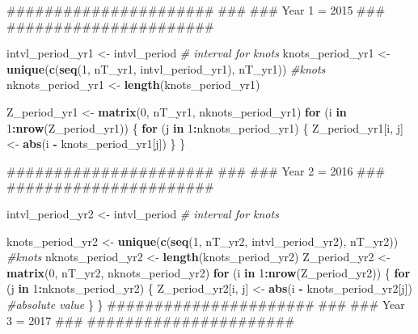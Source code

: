 \documentclass[11pt,]{article}
\newenvironment{Shaded}{\begin{snugshade}}{\end{snugshade}}
\newcommand{\KeywordTok}[1]{\textcolor[rgb]{0.13,0.29,0.53}{\textbf{#1}}}
\newcommand{\DecValTok}[1]{\textcolor[rgb]{0.00,0.00,0.81}{#1}}
\newcommand{\StringTok}[1]{\textcolor[rgb]{0.31,0.60,0.02}{#1}}
\newcommand{\CommentTok}[1]{\textcolor[rgb]{0.56,0.35,0.01}{\textit{#1}}}
\newcommand{\ControlFlowTok}[1]{\textcolor[rgb]{0.13,0.29,0.53}{\textbf{#1}}}
\newcommand{\OperatorTok}[1]{\textcolor[rgb]{0.81,0.36,0.00}{\textbf{#1}}}
\newcommand{\NormalTok}[1]{#1}
\begin{document}
\begin{Shaded}
\begin{Highlighting}[]
\NormalTok{######################}
\NormalTok{###}
\NormalTok{### Year 1 = 2015}
\NormalTok{###}
\NormalTok{######################}

\NormalTok{intvl_period_yr1 <-}\StringTok{ }\NormalTok{intvl_period }\CommentTok{# interval for knots}
\NormalTok{knots_period_yr1 <-}\StringTok{ }\KeywordTok{unique}\NormalTok{(}\KeywordTok{c}\NormalTok{(}\KeywordTok{seq}\NormalTok{(}\DecValTok{1}\NormalTok{,}
\NormalTok{                                 nT_yr1,}
\NormalTok{                                 intvl_period_yr1),}
\NormalTok{                             nT_yr1)) }\CommentTok{#knots}
\NormalTok{nknots_period_yr1 <-}\StringTok{ }\KeywordTok{length}\NormalTok{(knots_period_yr1)}

\NormalTok{Z_period_yr1 <-}\StringTok{ }\KeywordTok{matrix}\NormalTok{(}\DecValTok{0}\NormalTok{,}
\NormalTok{                     nT_yr1,}
\NormalTok{                     nknots_period_yr1)}
\ControlFlowTok{for}\NormalTok{ (i }\ControlFlowTok{in} \DecValTok{1}\OperatorTok{:}\KeywordTok{nrow}\NormalTok{(Z_period_yr1)) \{}
  \ControlFlowTok{for}\NormalTok{ (j }\ControlFlowTok{in} \DecValTok{1}\OperatorTok{:}\NormalTok{nknots_period_yr1) \{}
\NormalTok{    Z_period_yr1[i, j] <-}\StringTok{ }\KeywordTok{abs}\NormalTok{(i }\OperatorTok{-}\StringTok{ }\NormalTok{knots_period_yr1[j])}
\NormalTok{  \}}
\NormalTok{\}}

\NormalTok{######################}
\NormalTok{###}
\NormalTok{### Year 2 = 2016}
\NormalTok{###}
\NormalTok{######################}

\NormalTok{intvl_period_yr2 <-}\StringTok{ }\NormalTok{intvl_period }\CommentTok{# interval for knots}

\NormalTok{knots_period_yr2 <-}\StringTok{ }\KeywordTok{unique}\NormalTok{(}\KeywordTok{c}\NormalTok{(}\KeywordTok{seq}\NormalTok{(}\DecValTok{1}\NormalTok{,}
\NormalTok{                               nT_yr2,}
\NormalTok{                               intvl_period_yr2),}
\NormalTok{                            nT_yr2)) }\CommentTok{#knots}
\NormalTok{nknots_period_yr2 <-}\StringTok{ }\KeywordTok{length}\NormalTok{(knots_period_yr2)}
\NormalTok{Z_period_yr2 <-}\StringTok{ }\KeywordTok{matrix}\NormalTok{(}\DecValTok{0}\NormalTok{,}
\NormalTok{                       nT_yr2,}
\NormalTok{                       nknots_period_yr2)}
\ControlFlowTok{for}\NormalTok{ (i }\ControlFlowTok{in} \DecValTok{1}\OperatorTok{:}\KeywordTok{nrow}\NormalTok{(Z_period_yr2)) \{}
  \ControlFlowTok{for}\NormalTok{ (j }\ControlFlowTok{in} \DecValTok{1}\OperatorTok{:}\NormalTok{nknots_period_yr2) \{}
\NormalTok{    Z_period_yr2[i, j] <-}\StringTok{ }\KeywordTok{abs}\NormalTok{(i }\OperatorTok{-}\StringTok{ }\NormalTok{knots_period_yr2[j]) }\CommentTok{#absolute value}
\NormalTok{  \}}
\NormalTok{\}}
\NormalTok{######################}
\NormalTok{###}
\NormalTok{### Year 3 = 2017}
\NormalTok{###}
\NormalTok{######################}


\end{Highlighting}
\end{Shaded}
\end{document}
